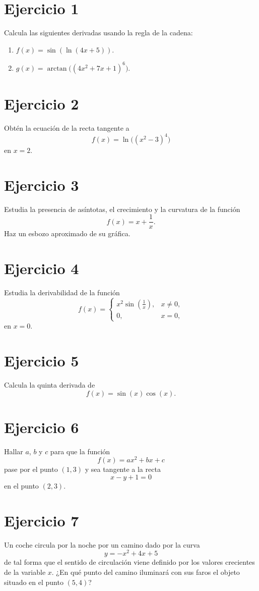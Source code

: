\documentclass[12pt]{article}
\begin{document}
\section*{Ejercicio 1}
Calcula las siguientes derivadas usando la regla de la cadena:
\begin{enumerate}[label=\alph*)]
    \item \(f(x)=\sin(\ln(4x+5))\).
    \item \(g(x)=\arctan\!\big((4x^2+7x+1)^6\big)\).
\end{enumerate}

\section*{Ejercicio 2}
Obtén la ecuación de la recta tangente a
\[
f(x)=\ln\big((x^2-3)^4\big)
\]
en \(x=2\).

\section*{Ejercicio 3}
Estudia la presencia de asíntotas, el crecimiento y la curvatura de la función
\[
f(x)=x+\frac{1}{x}.
\]
Haz un esbozo aproximado de su gráfica.

\section*{Ejercicio 4}
Estudia la derivabilidad de la función
\[
f(x)=
\begin{cases}
x^2\sin\!\left(\frac{1}{x}\right), & x\neq 0,\\[4pt]
0, & x=0,
\end{cases}
\]
en \(x=0\).

\section*{Ejercicio 5}
Calcula la quinta derivada de
\[
f(x)=\sin(x)\cos(x).
\]

\section*{Ejercicio 6}
Hallar \(a\), \(b\) y \(c\) para que la función
\[
f(x)=ax^2+bx+c
\]
pase por el punto \((1,3)\) y sea tangente a la recta
\[
x-y+1=0
\]
en el punto \((2,3)\).

\section*{Ejercicio 7}
Un coche circula por la noche por un camino dado por la curva
\[
y=-x^2+4x+5
\]
de tal forma que el sentido de circulación viene definido por los valores crecientes de la variable \(x\). ¿En qué punto del camino iluminará con sus faros el objeto situado en el punto \((5,4)\)?
\end{document}
